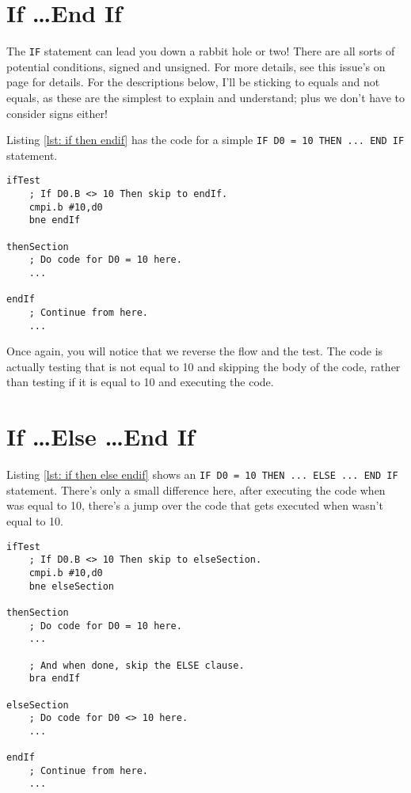 \section{If \ldots\protect End If}

The \texttt{IF} statement can lead you down a rabbit hole or two! There are all sorts of potential conditions, signed and unsigned. For more details, see this issue's  on page \pageref{chpater: beginners corner} for details. For the descriptions below, I'll be sticking to equals and not equals, as these are the simplest to explain and understand; plus we don't have to consider signs either!

Listing \ref{lst: if then endif} has the code for a simple \texttt{IF D0 = 10 THEN ... END IF} statement.

\begin{lstlisting}[caption={If \ldots THEN \ldots END IF},label={lst: if then endif}]
ifTest
    ; If D0.B <> 10 Then skip to endIf.
    cmpi.b #10,d0
    bne endIf
    
thenSection
    ; Do code for D0 = 10 here.
    ...
    
endIf
    ; Continue from here.
    ...
\end{lstlisting}

Once again, you will notice that we reverse the flow and the test. The code is actually testing that  is not equal to 10 and skipping the body of the code, rather than testing if it is equal to 10 and executing the code.

\section{If \ldots\protect Else \ldots\protect End If}

Listing \ref{lst: if then else endif} shows an \texttt{IF D0 = 10 THEN ... ELSE ... END IF} statement. There's only a small difference here, after executing the code when  was equal to 10, there's a jump over the code that gets executed when  wasn't equal to 10.


\begin{lstlisting}[caption={If \ldots THEN \ldots ELSE \ldots END IF},label={lst: if then else endif}]
ifTest
    ; If D0.B <> 10 Then skip to elseSection.
    cmpi.b #10,d0
    bne elseSection
    
thenSection
    ; Do code for D0 = 10 here.
    ...
    
    ; And when done, skip the ELSE clause.
    bra endIf
    
elseSection   
    ; Do code for D0 <> 10 here.
    ... 
    
endIf
    ; Continue from here.
    ...
\end{lstlisting}

